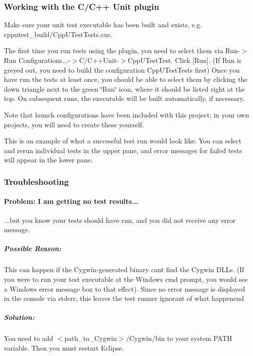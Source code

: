 \subsubsection*{Working with the C/\+C++ Unit plugin}

Make sure your unit test executable has been built and exists, e.\+g. cpputest\+\_\+build/\+Cpp\+U\+Test\+Tests.\+exe.

The first time you run tests using the plugin, you need to select them via Run-\/$>$Run Configurations...-\/$>$C/\+C++\+Unit-\/$>$Cpp\+U\+Test\+Test. Click \mbox{[}Run\mbox{]}. (If Run is greyed out, you need to build the configuration Cpp\+U\+Test\+Tests first) Once you have run the tests at least once, you should be able to select them by clicking the down triangle next to the green \char`\"{}\+Run\char`\"{} icon, where it should be listed right at the top. On subsequent runs, the executable will be built automatically, if necessary.

Note that launch configurations have been included with this project; in your own projects, you will need to create these yourself.

This is an example of what a successful test run would look like\+:  You can select and rerun individual tests in the upper pane, and error messages for failed tests will appear in the lower pane. \subsubsection*{Troubleshooting}

\paragraph*{Problem\+: I am getting no test results...}

...but you know your tests should have run, and you did not receive any error message. \subparagraph*{Possible Reason\+:}

This can happen if the Cygwin-\/generated binary can\textquotesingle{}t find the Cygwin D\+L\+Ls. (If you were to run your test executable at the Windows cmd prompt, you would see a Windows error message box to that effect). Since no error message is displayed in the console via stderr, this leaves the test runner ignorant of what happenend \subparagraph*{Solution\+:}

You need to add $<$path\+\_\+to\+\_\+\+Cygwin$>$/\+Cygwin/bin to your system P\+A\+TH variable. Then you must restart Eclipse. 